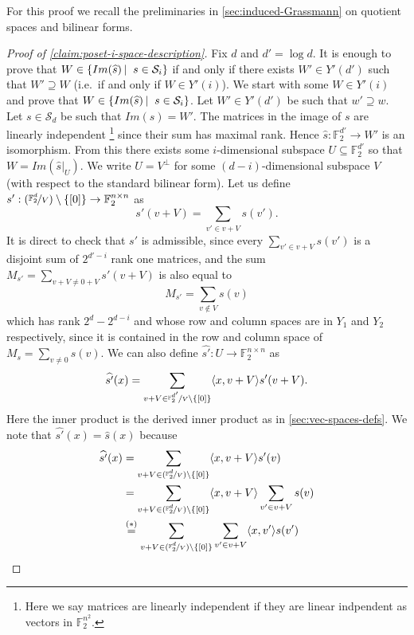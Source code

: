 \documentclass[10pt,a4paper]{article}
\newcommand{\prettyref}[1]{\cref{#1}}
\theoremstyle{definition}
\theoremstyle{remark}
\newcommand\sett[2]{\left\{ #1 \left| \; \vphantom{#1 #2} \right. #2  \right\}}
\newcommand{\set}[1]{\{#1\}}
\newcommand{\iprod}[1]{\langle#1\rangle}
\newcommand{\F}{\mathbb{F}}
\numberwithin{equation}{section}
\let\pref=\prettyref
\def\Y{Y}
\def\diml{d}
\def\dimlin{{\diml}}
\def\dimloutfull{{\diml'}}
\begin{document}
For this proof we recall the preliminaries in \pref{sec:induced-Grassmann} on quotient spaces and bilinear forms.
\begin{proof}[Proof of \pref{claim:poset-i-space-description}]
    Fix \(\dimlin\) and \(\dimloutfull = \log \dimlin\). It is enough to prove that \(W \in \sett{Im(\widehat{s})}{s \in \mathcal{S}_i}\) if and only if there exists \(W' \in \Y'(\dimloutfull)\) such that \(W' \supseteq W\) (i.e.\ if and only if \(W \in \Y'(i)\)). We start with some \(W \in \Y'(i)\) and prove that \(W \in \sett{Im(\widehat{s})}{s \in \mathcal{S}_i}\). Let \(W' \in \Y'(\dimloutfull)\) be such that \(w' \supseteq w\). Let \(s \in \mathcal{S}_d\) be such that \(Im(\widehat{s}) = W'\). The matrices in the image of \(s\) are linearly independent \footnote{Here we say matrices are linearly independent if they are linear indpendent as vectors in \(\F_2^{n^2}\).} since their sum has maximal rank. Hence \(\widehat{s}:\F_2^\dimloutfull \to W'\) is an isomorphism. From this there exists some \(i\)-dimensional subspace \(U \subseteq \F_2^{\dimloutfull}\) so that  \(W = Im(\widehat{s}|_U)\). We write \(U=V^\bot\) for some \((d-i)\)-dimensional subspace \(V\) (with respect to the standard bilinear form). Let us define \(s': (\nicefrac{\F_2^d}{V}) \setminus \set{[0]} \to \F_2^{n \times n}\) as
    \[s'(v+V) = \sum_{v' \in v+V} s(v').\]
    It is direct to check that \(s'\) is admissible, since every \(\sum_{v' \in v+V} s(v')\) is a disjoint sum of \(2^{\dimloutfull-i}\) rank one matrices, and the sum \(M_{s'} = \sum_{v+V \ne 0+V} s'(v+V)\) is also equal to
    \[M_{s'} = \sum_{v \notin V}s(v)\]
    which has rank \(2^d-2^{d-i}\) and whose row and column spaces are in \(\Y_1\) and \(\Y_2\) respectively, since it is contained in the row and column space of \(M_s = \sum_{v \ne 0}s(v)\). We can also define \(\widehat{s'}:U \to \F_2^{n \times n}\) as \[\widehat{s'}(x) = \sum_{v+V \in \nicefrac{\F_2^\dimloutfull}{V} \setminus \set{[0]}} \iprod{x,v+V} s'(v+V).\]
    Here the inner product is the derived inner product as in \pref{sec:vec-spaces-defs}. We note that 
    \(\widehat{s'}(x) = \widehat{s}(x)\) because
    \begin{align*}
        \widehat{s'}(x) &= \sum_{v+V \in (\nicefrac{\F_2^d}{V}) \setminus \set{[0]}} \iprod{x,v+V} s'(v) \\
        &= \sum_{v+V \in (\nicefrac{\F_2^d}{V}) \setminus \set{[0]}} \iprod{x,v+V} \sum_{v' \in v+V} s(v) \\
        &\overset{(*)}{=} \sum_{v+V \in (\nicefrac{\F_2^d}{V}) \setminus \set{[0]}} \sum_{v' \in v+V}\iprod{x,v'} s(v') \\

\end{align*}
\end{proof}
\end{document}
